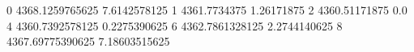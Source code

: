0 4368.1259765625 7.6142578125
1 4361.7734375 1.26171875
2 4360.51171875 0.0
4 4360.7392578125 0.2275390625
6 4362.7861328125 2.2744140625
8 4367.69775390625 7.18603515625
